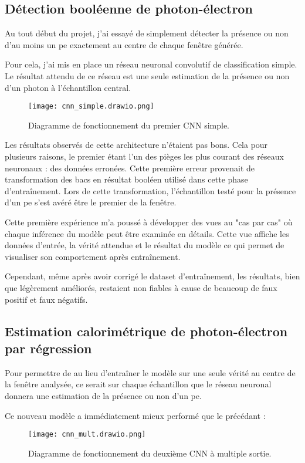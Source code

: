 \subsection{Détection booléenne de photon-électron}
Au tout début du projet, j'ai essayé de simplement détecter la présence ou non d'au moins un \gls{pe} exactement au centre de chaque fenêtre générée.

Pour cela, j'ai mis en place un réseau neuronal convolutif de classification simple.
Le résultat attendu de ce réseau est une seule estimation de la présence ou non d'un photon à l'échantillon central.
\begin{figure}[tbph!]
	\centering
	\texttt{[image: cnn\_simple.drawio.png]}
	\caption[Diagramme de fonctionnement du premier CNN simple]{Diagramme de fonctionnement du premier CNN simple.}
\end{figure}

Les résultats observés de cette architecture n'étaient pas bons.
Cela pour plusieurs raisons, le premier étant l'un des pièges les plus courant des réseaux neuronaux : des données erronées.
Cette première erreur provenait de transformation des bacs en résultat booléen utilisé dans cette phase d'entraînement.
Lors de cette transformation, l'échantillon testé pour la présence d'un \gls{pe} s'est avéré être le premier de la fenêtre.

Cette première expérience m'a poussé à développer des vues au "cas par cas" où chaque inférence du modèle peut être examinée en détails.
Cette vue affiche les données d'entrée, la vérité attendue et le résultat du modèle ce qui permet de visualiser son comportement après entraînement. 

Cependant, même après avoir corrigé le dataset d'entraînement, les résultats, bien que légèrement améliorés, restaient non fiables à cause de beaucoup de
faux positif et faux négatifs.

\subsection{Estimation calorimétrique de photon-électron par régression}
Pour permettre de au lieu d'entraîner le modèle sur une seule vérité au centre de la fenêtre analysée, ce serait sur chaque 
échantillon que le réseau neuronal donnera une estimation de la présence ou non d'un \gls{pe}.

Ce nouveau modèle a immédiatement mieux performé que le précédant :

\begin{figure}[tbph!]
	\centering
	\texttt{[image: cnn\_mult.drawio.png]}
	\caption[Diagramme de fonctionnement du deuxième CNN à multiple sortie]{Diagramme de fonctionnement du deuxième CNN à multiple sortie.}
\end{figure}

